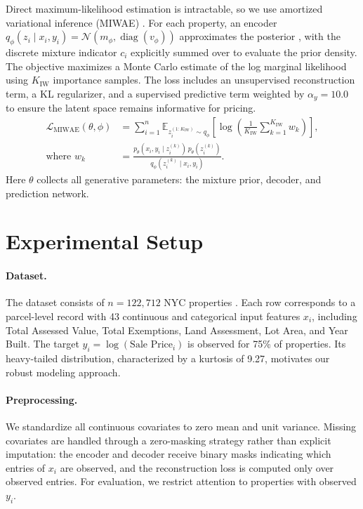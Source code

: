 \documentclass{article}
\begin{document}
Direct maximum-likelihood estimation is intractable, so we use amortized variational inference (MIWAE) \cite{burda2015importance, mattei2019miwae}. For each property, an encoder $q_\phi(z_i \mid x_i, y_i) = \mathcal{N}(m_\phi, \operatorname{diag}(v_\phi))$ approximates the posterior \cite{kingma14vae}, with the discrete mixture indicator $c_i$ explicitly summed over to evaluate the prior density. The objective maximizes a Monte Carlo estimate of the log marginal likelihood using $K_{\text{IW}}$ importance samples. The loss includes an unsupervised reconstruction term, a KL regularizer, and a supervised predictive term weighted by $\alpha_y = 10.0$ to ensure the latent space remains informative for pricing.
\[
\begin{split}
\mathcal{L}_{\text{MIWAE}}(\theta,\phi) \label{eq:miwae_loss}
&= \sum_{i=1}^n
\mathbb{E}_{z_i^{(1:K_{\text{IW}})} \sim q_\phi}
\left[
\log \left(
\frac{1}{K_{\text{IW}}} \sum_{k=1}^{K_{\text{IW}}} w_k
\right)
\right], \\
\text{where } w_k &= \frac{p_\theta(x_i, y_i \mid z_i^{(k)})\, p_\theta(z_i^{(k)})}
     {q_\phi(z_i^{(k)} \mid x_i, y_i)}.
\end{split}
\]
Here $\theta$ collects all generative parameters: the mixture prior, decoder, and prediction network.




\section{Experimental Setup}

\paragraph{Dataset.} The dataset consists of $n = 122{,}712$ NYC properties \cite{nycpluto}. Each row corresponds to a parcel-level record with 43 continuous and categorical input features $x_i$, including Total Assessed Value, Total Exemptions, Land Assessment, Lot Area, and Year Built. The target $y_i = \log(\text{Sale Price}_i)$ is observed for 75\% of properties. Its heavy-tailed distribution, characterized by a kurtosis of 9.27, motivates our robust modeling approach.

\paragraph{Preprocessing.} We standardize all continuous covariates to zero mean and unit variance. Missing covariates are handled through a zero-masking strategy rather than explicit imputation: the encoder and decoder receive binary masks indicating which entries of $x_i$ are observed, and the reconstruction loss is computed only over observed entries. For evaluation, we restrict attention to properties with observed $y_i$.
\end{document}
